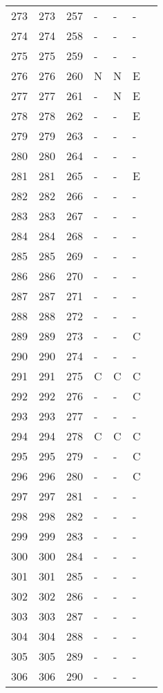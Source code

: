 \begin{longtable}{rrrllll}
  273 & 273 & 257 & - & - & - &  \\ 
  274 & 274 & 258 & - & - & - &  \\ 
  275 & 275 & 259 & - & - & - &  \\ 
  276 & 276 & 260 & N & N & E &  \\ 
  277 & 277 & 261 & - & N & E &  \\ 
  278 & 278 & 262 & - & - & E &  \\ 
  279 & 279 & 263 & - & - & - &  \\ 
  280 & 280 & 264 & - & - & - &  \\ 
  281 & 281 & 265 & - & - & E &  \\ 
  282 & 282 & 266 & - & - & - &  \\ 
  283 & 283 & 267 & - & - & - &  \\ 
  284 & 284 & 268 & - & - & - &  \\ 
  285 & 285 & 269 & - & - & - &  \\ 
  286 & 286 & 270 & - & - & - &  \\ 
  287 & 287 & 271 & - & - & - &  \\ 
  288 & 288 & 272 & - & - & - &  \\ 
  289 & 289 & 273 & - & - & C &  \\ 
  290 & 290 & 274 & - & - & - &  \\ 
  291 & 291 & 275 & C & C & C &  \\ 
  292 & 292 & 276 & - & - & C &  \\ 
  293 & 293 & 277 & - & - & - &  \\ 
  294 & 294 & 278 & C & C & C &  \\ 
  295 & 295 & 279 & - & - & C &  \\ 
  296 & 296 & 280 & - & - & C &  \\ 
  297 & 297 & 281 & - & - & - &  \\ 
  298 & 298 & 282 & - & - & - &  \\ 
  299 & 299 & 283 & - & - & - &  \\ 
  300 & 300 & 284 & - & - & - &  \\ 
  301 & 301 & 285 & - & - & - &  \\ 
  302 & 302 & 286 & - & - & - &  \\ 
  303 & 303 & 287 & - & - & - &  \\ 
  304 & 304 & 288 & - & - & - &  \\ 
  305 & 305 & 289 & - & - & - &  \\ 
  306 & 306 & 290 & - & - & - &  \\ 

\end{longtable}
